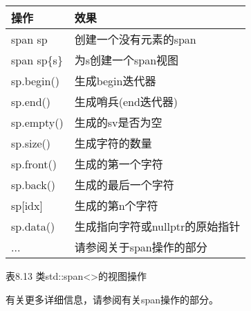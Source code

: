 \begin{longtable}[c]{|l|l|}
\hline
\textbf{操作} & \textbf{效果}                                   \\ \hline
\endfirsthead
%
\endhead
%
span sp            & 创建一个没有元素的span                   \\ \hline
span sp\{s\}       & 为s创建一个span视图                             \\ \hline
sp.begin()         & 生成begin迭代器                         \\ \hline
sp.end()           & 生成哨兵(end迭代器)                \\ \hline
sp.empty()         & 生成的sv是否为空                        \\ \hline
sp.size()          & 生成字符的数量                   \\ \hline
sp.front()         & 生成的第一个字符                        \\ \hline
sp.back()          & 生成的最后一个字符                         \\ \hline
sp{[}idx{]}        & 生成的第n个字符                         \\ \hline
sp.data()          & 生成指向字符或nullptr的原始指针 \\ \hline
...                & 请参阅关于span操作的部分            \\ \hline
\end{longtable}

\begin{center}
表8.13 类std::span<>的视图操作
\end{center}

有关更多详细信息，请参阅有关span操作的部分。









